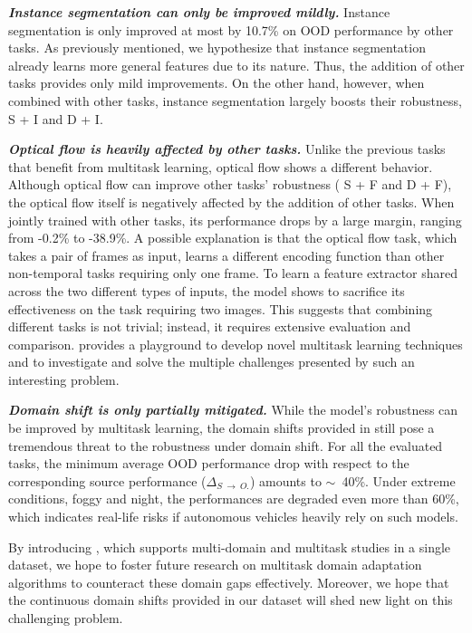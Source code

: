 \textit{\textbf{Instance segmentation can only be improved mildly.}} Instance segmentation is only improved at most by 10.7\% on OOD performance by other tasks. 
As previously mentioned, we hypothesize that instance segmentation already learns more general features due to its nature. Thus, the addition of other tasks provides only mild improvements.
On the other hand, however, when combined with other tasks, instance segmentation largely boosts their robustness, \eg{} S + I and D + I.

\textit{\textbf{Optical flow is heavily affected by other tasks.}} Unlike the previous tasks that benefit from multitask learning, optical flow shows a different behavior.  
Although optical flow can improve other tasks' robustness (\eg{} S + F and D + F), the optical flow itself is negatively affected by the addition of other tasks. 
When jointly trained with other tasks, its performance drops by a large margin, ranging from -0.2\% to -38.9\%. 
A possible explanation is that the optical flow task, which takes a pair of frames as input, learns a different encoding function than other non-temporal tasks requiring only one frame.
To learn a feature extractor shared across the two different types of inputs, the model shows to sacrifice its effectiveness on the task requiring two images.
This suggests that combining different tasks is not trivial; instead, it requires extensive evaluation and comparison.
\thedataset{} provides a playground to develop novel multitask learning techniques and to investigate and solve the multiple challenges presented by such an interesting problem. 

\textit{\textbf{Domain shift is only partially mitigated.}}  
While the model's robustness can be improved by multitask learning, the domain shifts provided in \thedataset{} still pose a tremendous threat to the robustness under domain shift. 
For all the evaluated tasks, the minimum average OOD performance drop with respect to the corresponding source performance ($\Delta_{S~\xrightarrow{}~O.}$) amounts to $\sim$~40\%. 
Under extreme conditions, \eg{} foggy and night, the performances are degraded even more than 60\%, which indicates real-life risks if autonomous vehicles heavily rely on such models.

By introducing \thedataset{}, which supports multi-domain and multitask studies in a single dataset, we hope to foster future research on multitask domain adaptation algorithms to counteract these domain gaps effectively.
Moreover, we hope that the continuous domain shifts provided in our dataset will shed new light on this challenging problem.    

